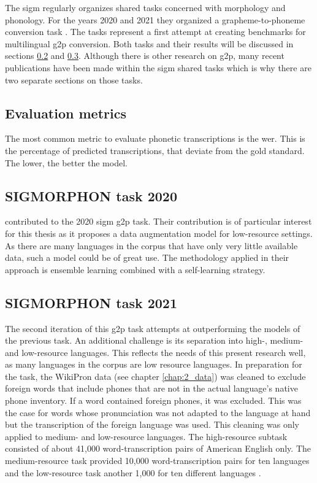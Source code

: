 The \ac{sigm} \citep{Sigmorphon.2021} regularly organizes shared tasks concerned with morphology and phonology. For the years 2020 and 2021 they organized a grapheme-to-phoneme conversion task \citep{Ashby&Bartley.2021, gorman-etal-2020-sigmorphon}. The tasks represent a first attempt at creating benchmarks for multilingual \ac{g2p} conversion. Both tasks and their results will be discussed in sections \ref{sig20} and \ref{sig21}. Although there is other research on \ac{g2p}, many recent publications have been made within the \ac{sigm} shared tasks which is why there are two separate sections on those tasks. 

\subsection{Evaluation metrics}
The most common metric to evaluate phonetic transcriptions is the \ac{wer}. This is the percentage of predicted transcriptions, that deviate from the gold standard. The lower, the better the model.   


\subsection{SIGMORPHON task 2020}
\label{sig20}

\citet{yu-etal-2020} contributed to the 2020 \ac{sigm} \ac{g2p} task. Their contribution is of particular interest for this thesis as it proposes a data augmentation model for low-resource settings. As there are many languages in the corpus that have only very little available data, such a model could be of great use. The methodology applied in their approach is ensemble learning combined with a self-learning strategy. 

\subsection{SIGMORPHON task 2021}
\label{sig21}
The second iteration of this \ac{g2p} task attempts at outperforming the models of the previous task. An additional challenge is its separation into high-, medium- and low-resource languages. This reflects the needs of this present research well, as many languages in the corpus are low resource languages. In preparation for the task, the WikiPron data (see chapter \ref{chap:2_data}) was cleaned to exclude foreign words that include phones that are not in the actual language's native phone inventory. If a word contained foreign phones, it was excluded. This was the case for words whose pronunciation was not adapted to the language at hand but the transcription of the foreign language was used. This cleaning was only applied to medium- and low-resource languages. The high-resource subtask consisted of about 41,000 word-transcription pairs of American English only. The medium-resource task provided 10,000 word-transcription pairs for ten languages and the low-resource task another 1,000 for ten different languages \citep{Ashby&Bartley.2021}. 


